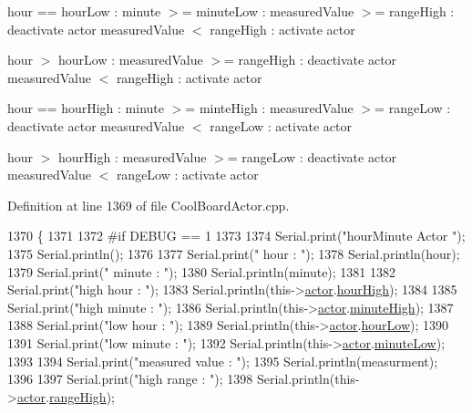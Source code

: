hour == hour\+Low \+: minute $>$= minute\+Low \+: measured\+Value $>$= range\+High \+: deactivate actor measured\+Value $<$ range\+High \+: activate actor

hour $>$ hour\+Low \+: measured\+Value $>$= range\+High \+: deactivate actor measured\+Value $<$ range\+High \+: activate actor

hour == hour\+High \+: minute $>$= minte\+High \+: measured\+Value $>$= range\+Low \+: deactivate actor measured\+Value $<$ range\+Low \+: activate actor

hour $>$ hour\+High \+: measured\+Value $>$= range\+Low \+: deactivate actor measured\+Value $<$ range\+Low \+: activate actor 

Definition at line 1369 of file Cool\+Board\+Actor.\+cpp.


\begin{DoxyCode}
1370 \{
1371 
1372 \textcolor{preprocessor}{#if DEBUG == 1}
1373     
1374     Serial.print(\textcolor{stringliteral}{"hourMinute Actor  "});
1375     Serial.println();
1376 
1377     Serial.print(\textcolor{stringliteral}{" hour : "});
1378     Serial.println(hour);
1379     Serial.print(\textcolor{stringliteral}{" minute : "});
1380     Serial.println(minute);
1381 
1382     Serial.print(\textcolor{stringliteral}{"high hour : "});
1383     Serial.println(this->\hyperlink{class_cool_board_actor_a8f190db9f7a39fddbcef7f152da970e9}{actor}.\hyperlink{struct_cool_board_actor_1_1state_acd1af3ac2382258a5b05497d814adc01}{hourHigh});
1384 
1385     Serial.print(\textcolor{stringliteral}{"high minute : "});
1386     Serial.println(this->\hyperlink{class_cool_board_actor_a8f190db9f7a39fddbcef7f152da970e9}{actor}.\hyperlink{struct_cool_board_actor_1_1state_a4bff3d61ead74adb60be224764b93006}{minuteHigh});
1387 
1388     Serial.print(\textcolor{stringliteral}{"low hour : "});
1389     Serial.println(this->\hyperlink{class_cool_board_actor_a8f190db9f7a39fddbcef7f152da970e9}{actor}.\hyperlink{struct_cool_board_actor_1_1state_ae7034bf95b36f1392f9de076fa0c8c0f}{hourLow});
1390 
1391     Serial.print(\textcolor{stringliteral}{"low minute : "});
1392     Serial.println(this->\hyperlink{class_cool_board_actor_a8f190db9f7a39fddbcef7f152da970e9}{actor}.\hyperlink{struct_cool_board_actor_1_1state_acbcc2902331fd9d757cd475eb403bdd9}{minuteLow});
1393 
1394     Serial.print(\textcolor{stringliteral}{"measured value : "});
1395     Serial.println(measurment);
1396 
1397     Serial.print(\textcolor{stringliteral}{"high range : "});
1398     Serial.println(this->\hyperlink{class_cool_board_actor_a8f190db9f7a39fddbcef7f152da970e9}{actor}.\hyperlink{struct_cool_board_actor_1_1state_a6e5cd6c5cd44e2decfd8d4df1853f8e3}{rangeHigh});

\end{DoxyCode}
